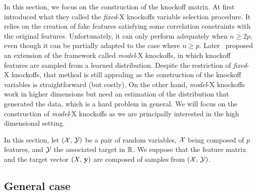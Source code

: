 In this section, we focus on the construction of the knockoff matrix.
At first~\cite{fixed_x_knockoffs} introduced what they called the
\textit{fixed}-X knockoffs variable selection procedure.
It relies on the creation of fake features satisfying some correlation constraints with the original features.
Unfortunately, it can only perform adequately when $n \geq 2p$,
even though it can be partially adapted to the case where $n \geq p$.
Later~\cite{model_x_knockoffs} proposed an extension of the framework called \textit{model}-X knockoffs,
in which knockoff features are sampled from a learned distribution.
Despite the restriction of \textit{fixed}-X knockoffs, that method is still appealing as the construction of the
knockoff variables is straightforward (but costly).
On the other hand, \textit{model}-X knockoffs work in higher dimensions
but need an estimation of the distribution that generated the data,
which is a hard problem in general.
We will focus on the construction of \textit{model}-X knockoffs as we are principally interested in the
high dimensional setting.

In this section, let $(\mathcal{X},\, \mathcal{Y})$ be a pair of random variables,
$\mathcal{X}$ being composed of $p$ features,
and $\mathcal{Y}$ the associated target in $\mathbb{R}$.
We suppose that the feature matrix and the target vector $(X,\, \mathbf{y})$ are composed of samples from $(\mathcal{X},\, \mathcal{Y})$.

\subsection{General case}\label{subsec:general_case}

